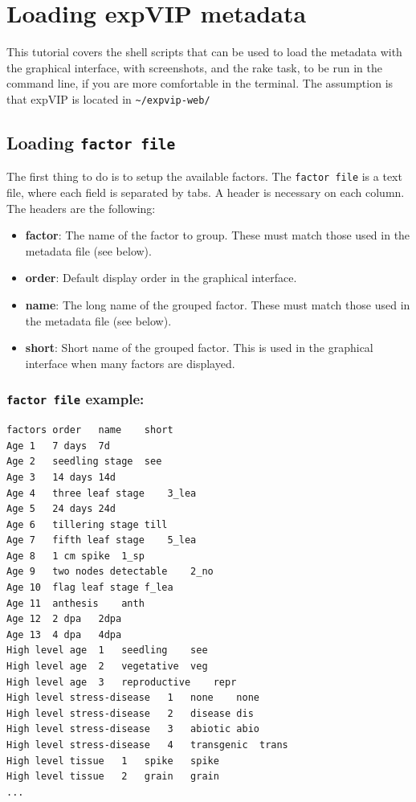 
\section{Loading expVIP metadata}\label{loading-expvip-metadata}

This tutorial covers the shell scripts that can be used to load the
metadata with the graphical interface, with screenshots, and the rake
task, to be run in the command line, if you are more comfortable in the
terminal. The assumption is that expVIP is located in
\lstinline!~/expvip-web/!

\subsection{Loading \texttt{factor file}}\label{loading-factor-file}

The first thing to do is to setup the available factors. The
\lstinline!factor file! is a text file, where each field is separated by
tabs. A header is necessary on each column. The headers are the
following:

\begin{itemize}
\itemsep1pt\parskip0pt
\item
  \textbf{factor}: The name of the factor to group. These must match
  those used in the metadata file (see below).
\item
  \textbf{order}: Default display order in the graphical interface.
\item
  \textbf{name}: The long name of the grouped factor. These must match
  those used in the metadata file (see below).
\item
  \textbf{short}: Short name of the grouped factor. This is used in the
  graphical interface when many factors are displayed.
\end{itemize}

\subsubsection{\texttt{factor file}
example:}\label{factor-file-example}

\begin{lstlisting}
factors order   name    short
Age 1   7 days  7d
Age 2   seedling stage  see
Age 3   14 days 14d
Age 4   three leaf stage    3_lea
Age 5   24 days 24d
Age 6   tillering stage till
Age 7   fifth leaf stage    5_lea
Age 8   1 cm spike  1_sp
Age 9   two nodes detectable    2_no
Age 10  flag leaf stage f_lea
Age 11  anthesis    anth
Age 12  2 dpa   2dpa
Age 13  4 dpa   4dpa
High level age  1   seedling    see
High level age  2   vegetative  veg
High level age  3   reproductive    repr
High level stress-disease   1   none    none
High level stress-disease   2   disease dis
High level stress-disease   3   abiotic abio
High level stress-disease   4   transgenic  trans
High level tissue   1   spike   spike
High level tissue   2   grain   grain
...
\end{lstlisting}

